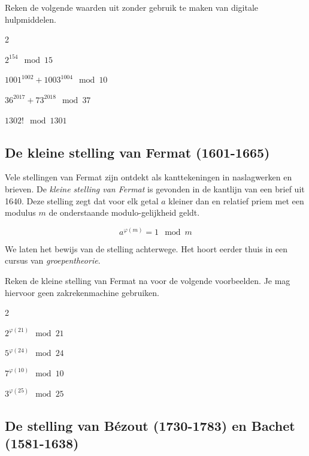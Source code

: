 \begin{oef}
Reken de volgende waarden uit zonder gebruik te maken van digitale hulpmiddelen.

\begin{multicols} {2}
\begin{enumoef}
\item $2^{154} \mod 15$
\item $1001^{1002}+1003^{1004} \mod 10$
\item $36^{2017}+73^{2018} \mod 37$
\item $1302! \mod 1301$
\end{enumoef}
\end{multicols}
\end{oef}

\subsection{De kleine stelling van Fermat (1601-1665)}

Vele stellingen van Fermat zijn ontdekt als kanttekeningen in naslagwerken en brieven. De \emph{kleine stelling van Fermat} is gevonden in de kantlijn van een brief uit 1640. Deze stelling zegt dat voor elk getal $a$ kleiner dan en relatief priem met een modulus $m$ de onderstaande modulo-gelijkheid geldt.

\[a^{\varphi(m)}=1 \mod m\]

\noindent We laten het bewijs van de stelling achterwege. Het hoort eerder thuis in een cursus van \emph{groepentheorie}.

\begin{oef}
Reken de kleine stelling van Fermat na voor de volgende voorbeelden. Je mag hiervoor geen zakrekenmachine gebruiken.

\begin{multicols} {2}
\begin{enumoef}
\item $2^{\varphi(21)} \mod 21$
\item $5^{\varphi(24)} \mod 24$
\item $7^{\varphi(10)} \mod 10$
\item $3^{\varphi(25)} \mod 25$
\end{enumoef}
\end{multicols}
\end{oef}

\subsection{De stelling van Bézout (1730-1783) en Bachet (1581-1638)}

